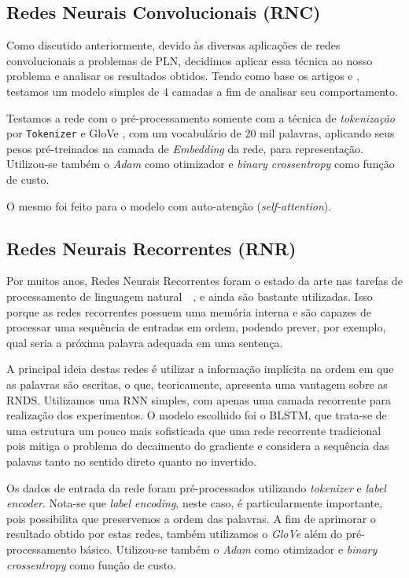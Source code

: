 \documentclass[twoside,conference,a4paper]{IEEEtran}
\begin{document}
\subsection{Redes Neurais Convolucionais (RNC)}

    Como discutido anteriormente, devido às diversas aplicações de redes convolucionais a problemas de PLN, decidimos aplicar essa técnica ao nosso problema e analisar os resultados obtidos. Tendo como base os artigos \cite{cnn-sarcastic} e \cite{text-cnn-rnn}, testamos um modelo simples de 4 camadas a fim de analisar seu comportamento.
    
    Testamos a rede com o pré-processamento somente com a técnica de \textit{tokenização} por \texttt{Tokenizer} e GloVe \cite{glove}, com um vocabulário de 20 mil palavras, aplicando seus pesos pré-treinados na camada de \textit{Embedding} da rede, para representação. Utilizou-se também o \textit{Adam} como otimizador e \textit{binary crossentropy} como função de custo.
    
    O mesmo foi feito para o modelo com auto-atenção (\textit{self-attention}).
    
\subsection{Redes Neurais Recorrentes (RNR)}

    Por muitos anos, Redes Neurais Recorrentes foram o estado da arte nas tarefas de processamento de linguagem natural~\cite{rnn_state_art-1}~\cite{rnn_state_art-2}, e ainda são bastante utilizadas. Isso porque as redes recorrentes possuem uma memória interna e são capazes de processar uma sequência de entradas em ordem, podendo prever, por exemplo, qual seria a próxima palavra adequada em uma sentença.

    A principal ideia destas redes é utilizar a informação implícita na ordem em que as palavras são escritas, o que, teoricamente, apresenta uma vantagem sobre as RNDS. Utilizamos uma RNN simples, com apenas uma camada recorrente para realização dos experimentos. O modelo escolhido foi o BLSTM, que trata-se de uma estrutura um pouco mais sofisticada que uma rede recorrente tradicional pois mitiga o problema do decaimento do gradiente e considera a sequência das palavas tanto no sentido direto quanto no invertido.
    
    Os dados de entrada da rede foram pré-processados utilizando \textit{tokenizer} e \textit{label encoder}. Nota-se que \textit{label encoding}, neste caso, é particularmente importante, pois possibilita que preservemos a ordem das palavras. A fim de aprimorar o resultado obtido por estas redes, também utilizamos o \textit{GloVe} além do pré-processamento básico. Utilizou-se também o \textit{Adam} como otimizador e \textit{binary crossentropy} como função de custo.
    
\end{document}
